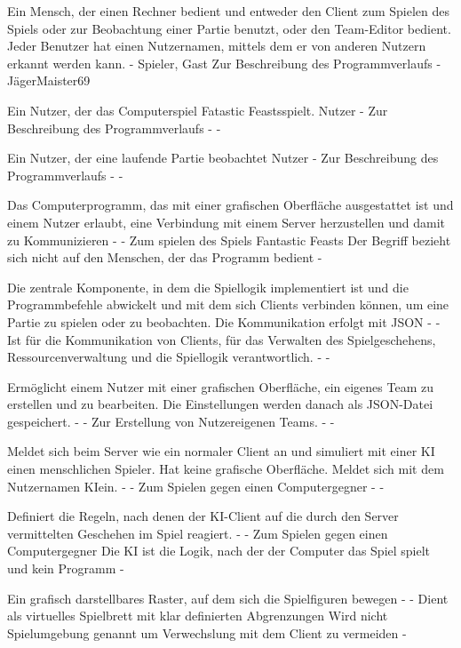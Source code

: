 {Ein Mensch, der einen Rechner bedient und entweder den Client zum Spielen des Spiels oder zur Beobachtung einer Partie benutzt, oder den Team-Editor bedient. Jeder Benutzer hat einen Nutzernamen, mittels dem er von anderen Nutzern erkannt werden kann.}
{-}
{Spieler, Gast}
{Zur Beschreibung des Programmverlaufs}
{-}
{JägerMaister69}

{Ein Nutzer, der das Computerspiel \glqq Fatastic Feasts\grqq spielt.}
{Nutzer}
{-}
{Zur Beschreibung des Programmverlaufs}
{-}
{-}

{Ein Nutzer, der eine laufende Partie beobachtet}
{Nutzer}
{-}
{Zur Beschreibung des Programmverlaufs}
{-}
{-}

{Das Computerprogramm, das mit einer grafischen Oberfläche ausgestattet ist und einem Nutzer erlaubt, eine Verbindung mit einem Server herzustellen und damit zu Kommunizieren}
{-}
{-}
{Zum spielen des Spiels \glqq Fantastic Feasts\grqq}
{Der Begriff bezieht sich nicht auf den Menschen, der das Programm bedient}
{-}

{Die zentrale Komponente, in dem die Spiellogik implementiert ist und die Programmbefehle abwickelt und mit dem sich Clients verbinden können, um eine Partie zu spielen oder zu beobachten. Die Kommunikation erfolgt mit JSON}
{-}
{-}
{Ist für die Kommunikation von Clients, für das Verwalten des Spielgeschehens, Ressourcenverwaltung und die Spiellogik verantwortlich.}
{-}
{-}

{Ermöglicht einem Nutzer mit einer grafischen Oberfläche, ein eigenes Team zu erstellen und zu bearbeiten. Die Einstellungen werden danach als JSON-Datei gespeichert.}
{-}
{-}
{Zur Erstellung von Nutzereigenen Teams.}
{-}
{-}

{Meldet sich beim Server wie ein normaler Client an und simuliert mit einer KI einen menschlichen Spieler. Hat keine grafische Oberfläche. Meldet sich mit dem Nutzernamen \glqq KI\grqq ein.}
{-}
{-}
{Zum Spielen gegen einen Computergegner}
{-}
{-}

{Definiert die Regeln, nach denen der KI-Client auf die durch den Server vermittelten Geschehen im Spiel reagiert.}
{-}
{-}
{Zum Spielen gegen einen Computergegner}
{Die KI ist die Logik, nach der der Computer das Spiel spielt und kein Programm}
{-}

{Ein grafisch darstellbares Raster, auf dem sich die Spielfiguren bewegen}
{-}
{-}
{Dient als virtuelles Spielbrett mit klar definierten Abgrenzungen}
{Wird nicht Spielumgebung genannt um Verwechslung mit dem Client zu vermeiden}
{-}

